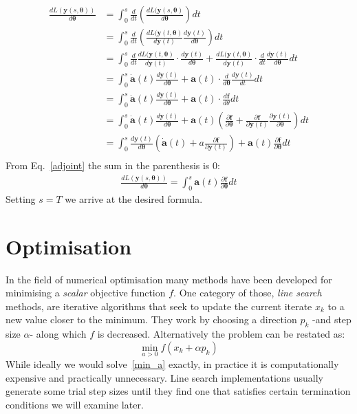 \documentclass[11pt]{report}
\begin{document}
    \begin{align*}
        \frac{ d L(\bm{y}(s, \bm{\theta})) }{ d \bm{\theta} }
        &= \int_0^s \frac{d}{dt} \left( \frac{ d L(\bm{y}(s, \bm{\theta})}{ d \bm{\theta}} \right) dt \\
        &= \int_0^s \frac{d}{dt} \left( \frac{ d L(\bm{y}(t, \bm{\theta})}{ d \bm{y}(t)} \frac{d \bm{y}(t)}{d\bm{\theta}} \right) dt \\
        &= \int_0^s
        \frac{d}{dt} \frac{ d L(\bm{y}(t, \bm{\theta})}{ d \bm{y}(t)} \cdot \frac{d \bm{y}(t)}{d\bm{\theta}}
        +
        \frac{ d L(\bm{y}(t, \bm{\theta})}{ d \bm{y}(t)} \cdot \frac{d}{dt} \frac{d \bm{y}(t)}{d\bm{\theta}}
        dt \\
        &= \int_0^s
        \dot{\bm{a}}(t) \frac{d \bm{y}(t)}{d\bm{\theta}}
        +
        \bm{a}(t) \cdot \frac{d}{d\bm{\theta}} \frac{d \bm{y}(t)}{dt}
        dt \\
        &= \int_0^s
        \dot{\bm{a}}(t) \frac{d \bm{y}(t)}{d\bm{\theta}}
        +
        \bm{a}(t) \cdot \frac{d\bm{f}}{d\theta}
        dt \\
        &= \int_0^s
        \dot{\bm{a}}(t) \frac{d \bm{y}(t)}{d\bm{\theta}}
        +
        \bm{a}(t) \left( \frac{\partial \bm{f}}{\partial \bm{\theta}}
        +
        \frac{\partial \bm{f}}{\partial \bm{y}(t)} \frac{\partial \bm{y}(t)}{\partial \bm{\theta}}\right)
        dt \\
        &= \int_0^s
        \frac{d \bm{y}(t)}{d\bm{\theta}}
        \left( \dot{\bm{a}}(t) + a\frac{\partial \bm{f}}{\partial \bm{y}(t)} \right)
        +
        \bm{a}(t) \frac{\partial \bm{f}}{\partial \bm{\theta}}
        dt \\
    \end{align*}
    From Eq.~\eqref{adjoint} the sum in the parenthesis is 0:
    \begin{align}
        \frac{ d L(\bm{y}(s, \bm{\theta})) }{ d \bm{\theta} }
        = \int_0^s
        \bm{a}(t) \frac{\partial \bm{f}}{\partial \bm{\theta}}
        dt
    \end{align}
    Setting $s=T$ we arrive at the desired formula.


    \chapter{Optimisation}
    In the field of numerical optimisation many methods have been developed for minimising a \textit{scalar} objective function $f$.
    One category of those, \textit{line search} methods, are iterative algorithms that seek to update the current iterate $x_k$ to a new value closer to the minimum.
    They work by choosing a direction $p_k$ -and step size $\alpha$- along which $f$ is decreased.
    Alternatively the problem can be restated as:
    \begin{equation}
        \min_{a>0} f(x_k + \alpha p_k) \label{min_a}
    \end{equation}
    While ideally we would solve~\eqref{min_a} exactly, in practice it is computationally expensive and practically unnecessary.
    Line search implementations usually generate some trial step sizes until they find one that satisfies certain termination conditions we will examine later.
\end{document}

